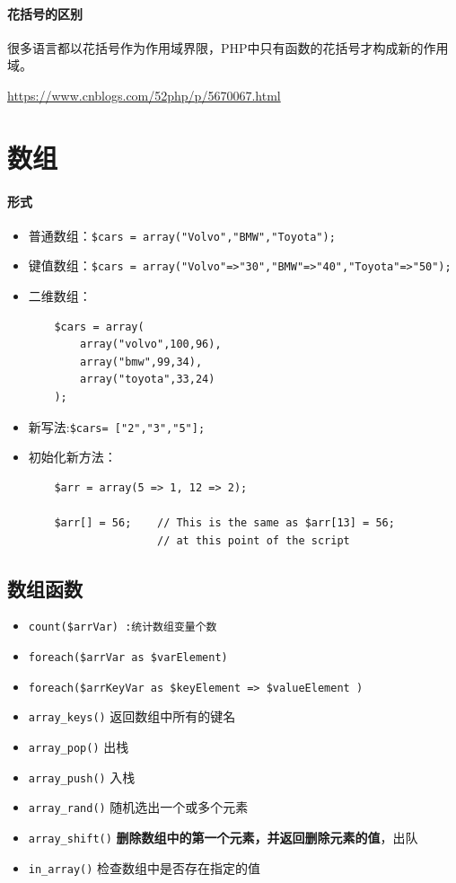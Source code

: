 \documentclass[UTF8,a4paper,12pt]{ctexbook}
\begin{document}
		\paragraph{花括号的区别}
			很多语言都以花括号作为作用域界限，PHP中只有函数的花括号才构成新的作用域。
			
			\url{https://www.cnblogs.com/52php/p/5670067.html}	
	\section{数组}
		\paragraph{形式}
			\begin{itemize}
				\item 普通数组：\verb|$cars = array("Volvo","BMW","Toyota");|
				\item 键值数组：\verb|$cars = array("Volvo"=>"30","BMW"=>"40","Toyota"=>"50");|
				\item 二维数组：
					\begin{lstlisting}
	$cars = array(
		array("volvo",100,96),
		array("bmw",99,34),
		array("toyota",33,24)
	);
					\end{lstlisting}
				\item 新写法:\verb|$cars= ["2","3","5"];|
				\item 初始化新方法：
					\begin{lstlisting}
	$arr = array(5 => 1, 12 => 2);
	
	$arr[] = 56;    // This is the same as $arr[13] = 56;
	                // at this point of the script
					\end{lstlisting}
			\end{itemize}
			
		
		\subsection{数组函数}
			\begin{itemize}
				\item \verb|count($arrVar) :统计数组变量个数|
				\item \verb|foreach($arrVar as $varElement)|
				\item \verb|foreach($arrKeyVar as $keyElement => $valueElement )|
				\item \verb|array_keys()| 返回数组中所有的键名
				\item \verb|array_pop()| 出栈
				\item \verb|array_push()| 入栈
				\item \verb|array_rand()| 随机选出一个或多个元素
				\item \verb|array_shift()| \textbf{删除数组中的第一个元素，并返回删除元素的值}，出队
				\item \verb|in_array()| 检查数组中是否存在指定的值
			\end{itemize}	
			
\end{document}
